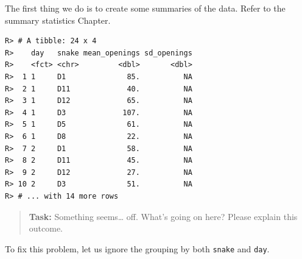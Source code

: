 \documentclass[english,10pt,a4paper,oneside]{book}
\newenvironment{Shaded}{\begin{snugshade}}{\end{snugshade}}
\newcommand{\DataTypeTok}[1]{\textcolor[rgb]{0.13,0.29,0.53}{#1}}
\newcommand{\KeywordTok}[1]{\textcolor[rgb]{0.13,0.29,0.53}{\textbf{#1}}}
\newcommand{\NormalTok}[1]{#1}
\newcommand{\OperatorTok}[1]{\textcolor[rgb]{0.81,0.36,0.00}{\textbf{#1}}}
\newcommand{\StringTok}[1]{\textcolor[rgb]{0.31,0.60,0.02}{#1}}
\theoremstyle{definition}
\theoremstyle{definition}
\theoremstyle{definition}
\theoremstyle{remark}
\begin{document}
The first thing we do is to create some summaries of the data. Refer to
the summary statistics Chapter.

\begin{Shaded}
\end{Shaded}

\begin{verbatim}
R> # A tibble: 24 x 4
R>    day   snake mean_openings sd_openings
R>    <fct> <chr>         <dbl>       <dbl>
R>  1 1     D1              85.          NA
R>  2 1     D11             40.          NA
R>  3 1     D12             65.          NA
R>  4 1     D3             107.          NA
R>  5 1     D5              61.          NA
R>  6 1     D8              22.          NA
R>  7 2     D1              58.          NA
R>  8 2     D11             45.          NA
R>  9 2     D12             27.          NA
R> 10 2     D3              51.          NA
R> # ... with 14 more rows
\end{verbatim}

\begin{quote}
\textbf{Task:} Something seems\ldots{} off. What's going on here? Please
explain this outcome.
\end{quote}

To fix this problem, let us ignore the grouping by both \texttt{snake}
and \texttt{day}.

\begin{Shaded}
\end{Shaded}
\end{document}
